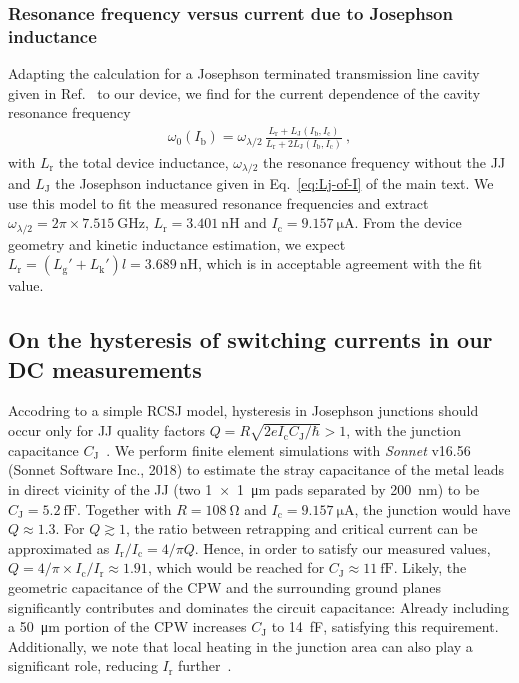 \subsubsection{Resonance frequency versus current due to Josephson inductance}\label{sec:resfit}

% 
Adapting the calculation for a Josephson terminated transmission line cavity given in Ref.~\cite{pogorzalekHystereticFluxResponse2017} to our device, we find for the current dependence of the cavity resonance frequency
% 
\begin{align}
\omega_0(I_\text{b})=\omega_{\lambda/2}\,\frac{L_\text{r}+L_\text{J}(I_\text{b},I_\text{c})}{L_\text{r} + 2L_\text{J}(I_\text{b},I_\text{c})}\ ,
\end{align}
% 
with $L_\text{r}$ the total device inductance, $\omega_{\lambda/2}$ the resonance frequency without the JJ and $L_\text{J}$ the Josephson inductance given in Eq.~\eqref{eq:Lj-of-I} of the main text.
% 
We use this model to fit the measured resonance frequencies and extract $\omega_{\lambda/2}=2\pi\times\SI{7.515}{\giga\hertz}$, $L_\text{r}=\SI{3.401}{\nano\henry}$ and $I_\text{c}=\SI{9.157}{\micro\ampere}$.
% 
From the device geometry and kinetic inductance estimation, we expect $L_\text{r}=(L_\text{g}'+L_\text{k}')l=\SI{3.689}{\nano\henry}$, which is in acceptable agreement with the fit value.

\subsection{On the hysteresis of switching currents in our DC measurements}\label{sec:hysteresis}
% 
Accodring to a simple RCSJ model, hysteresis in Josephson junctions should occur only for JJ quality factors $Q=R\sqrt{2eI_\text{c} C_\text{J}/\hbar} > 1$, with the junction capacitance $C_\text{J}$~\cite{tinkhamIntroductionSuperconductivity1996}.
% 
We perform finite element simulations with \textit{Sonnet} v16.56 (Sonnet Software Inc., 2018) to estimate the stray capacitance of the metal leads in direct vicinity of the JJ (two \SI{1x1}{\micro\meter} pads separated by \SI{200}{\nano\meter}) to be $C_\text{J}=\SI{5.2}{\femto\farad}$.
% 
Together with $R=\SI{108}{\ohm}$ and $I_\text{c}=\SI{9.157}{\micro\ampere}$, the junction would have $Q\approx1.3$.
% 
For $Q \gtrsim 1$, the ratio between retrapping and critical current can be approximated as $I_\text{r}/I_\text{c}=4/\pi Q$.
% 
Hence, in order to satisfy our measured values, $Q=4/\pi\times I_\text{c}/ I_\text{r}\approx1.91$, which would be reached for $C_\text{J}\approx\SI{11}{\femto\farad}$.
% 
Likely, the geometric capacitance of the CPW and the surrounding ground planes significantly contributes and dominates the circuit capacitance:
% 
Already including a \SI{50}{\micro\meter} portion of the CPW increases $C_\text{J}$ to \SI{14}{\femto\farad}, satisfying this requirement.
% 
Additionally, we note that local heating in the junction area can also play a significant role, reducing $I_\text{r}$ further~\cite{skocpolSelfHeatingHotspots1974,hazraHysteresisSuperconductingShort2010,kumarReversibilitySuperconductingNb2015}.

